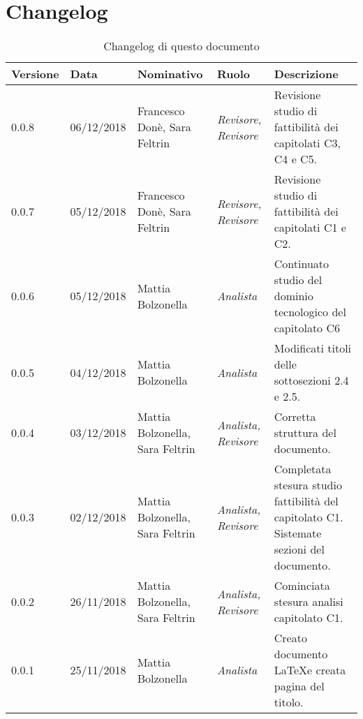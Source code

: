 
\section{Changelog}
\begin{table}[tbph]
        \centering
        \begin{tabularx}{\textwidth}{|l|l|l|l|X|}
                \hline
                \textbf{Versione} & \textbf{Data} & \textbf{Nominativo}  & \textbf{Ruolo} & 
                \textbf{Descrizione}\\
                
                \hline \hline
              	0.0.8 & 06/12/2018 & Francesco Donè, Sara Feltrin & 
              	\textit{Revisore, Revisore} & 
              	Revisione studio di fattibilità dei capitolati C3, C4 e C5.\\
                
                \hline
                0.0.7 & 05/12/2018 & Francesco Donè, Sara Feltrin & 
                \textit{Revisore, Revisore} & 
                Revisione studio di fattibilità dei capitolati C1 e C2.\\
                
                \hline
                0.0.6 & 05/12/2018 & Mattia Bolzonella & 
                \textit{Analista} & 
                Continuato studio del dominio tecnologico del capitolato C6\\
                
                \hline
                0.0.5 & 04/12/2018 & Mattia Bolzonella & 
                \textit{Analista} & 
                Modificati titoli delle sottosezioni 2.4 e 2.5. \\
                
                \hline
                0.0.4 & 03/12/2018 & Mattia Bolzonella, Sara Feltrin & 
                \textit{Analista, Revisore} &
                Corretta struttura del documento. \\
                
                \hline
                0.0.3 & 02/12/2018 & Mattia Bolzonella, Sara Feltrin &
                \textit{Analista, Revisore} &
                Completata stesura studio fattibilità del capitolato C1.
                Sistemate sezioni del documento. \\
                
                \hline
                0.0.2 & 26/11/2018 & Mattia Bolzonella, Sara Feltrin & 
                \textit{Analista, Revisore} &
                Cominciata stesura analisi capitolato C1.\\

                \hline
                0.0.1 & 25/11/2018 & Mattia Bolzonella & 
                \textit{Analista} &
                Creato documento \LaTeX e creata pagina del titolo.\\
                
                \hline
                
        \end{tabularx}
        \caption{Changelog di questo documento}
\end{table}